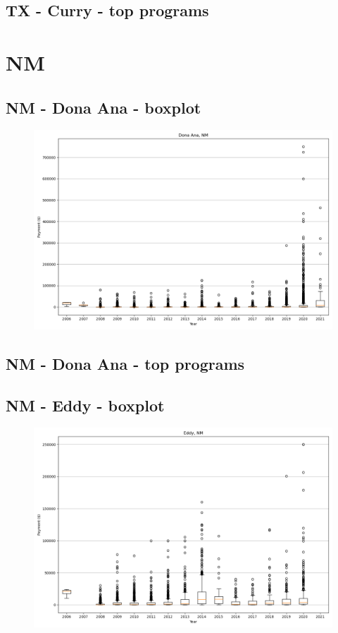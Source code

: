 \subsection*{TX - Curry - top programs}

\newpage
\section*{NM}
\subsection*{NM - Dona Ana - boxplot}
\begin{figure}[h]
\centering
\includegraphics[width=7in]{../output/boxplots/counties/Dona Ana-NM_boxplot.png}
\end{figure}


\subsection*{NM - Dona Ana - top programs}

\newpage
\subsection*{NM - Eddy - boxplot}
\begin{figure}[h]
\centering
\includegraphics[width=7in]{../output/boxplots/counties/Eddy-NM_boxplot.png}
\end{figure}


